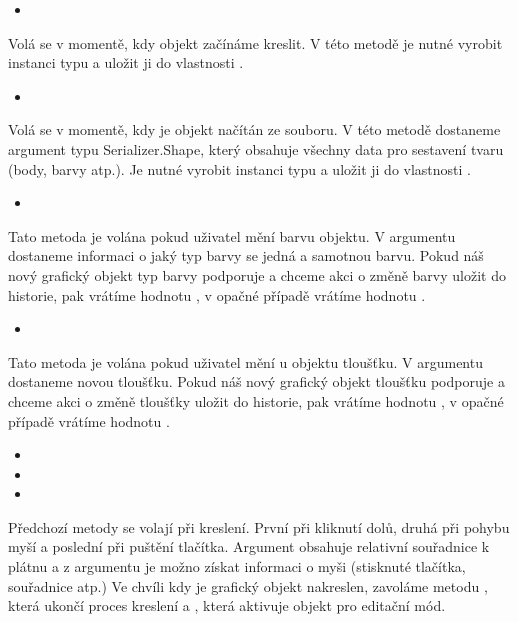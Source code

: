 \documentclass[
  field=inf,
  biblatex,
  glossaries,
  index
]{kidiplom}
\begin{document}
\begin{itemize}
\item {}
\end{itemize}
Volá se v momentě, kdy objekt začínáme kreslit. V této metodě je nutné vyrobit instanci typu  a uložit ji do vlastnosti .


\begin{itemize}
\item {}
\end{itemize}
Volá se v momentě, kdy je objekt načítán ze souboru. V této metodě dostaneme argument typu {Serializer.Shape}, který obsahuje všechny data pro sestavení tvaru (body, barvy atp.). Je nutné vyrobit instanci typu  a uložit ji do vlastnosti .


\begin{itemize}
\item {}
\end{itemize}
Tato metoda je volána pokud uživatel mění barvu objektu. V argumentu dostaneme informaci o jaký typ barvy se jedná a samotnou barvu. Pokud náš nový grafický objekt typ barvy podporuje a chceme akci o změně barvy uložit do historie, pak vrátíme hodnotu , v opačné případě vrátíme hodnotu .

\begin{itemize}
\item {}
\end{itemize}
Tato metoda je volána pokud uživatel mění u objektu tloušťku. V argumentu dostaneme novou tloušťku. Pokud náš nový grafický objekt tloušťku podporuje a chceme akci o změně tloušťky uložit do historie, pak vrátíme hodnotu , v opačné případě vrátíme hodnotu .

\begin{itemize}
\item {}
\item {}
\item {}
\end{itemize}
Předchozí metody se volají při kreslení. První při kliknutí dolů, druhá při pohybu myší a poslední při puštění tlačítka. Argument  obsahuje relativní souřadnice k plátnu a z argumentu  je možno získat informaci o myši (stisknuté tlačítka, souřadnice atp.) Ve chvíli kdy je grafický objekt nakreslen, zavoláme metodu , která ukončí proces kreslení a , která aktivuje objekt pro editační mód.
\end{document}

